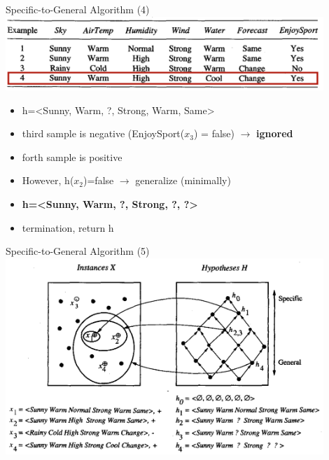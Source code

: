 \documentclass{beamer}
\begin{document}
\begin{frame}{Specific-to-General Algorithm (4)}
\centering
\includegraphics[width=0.9\textwidth]{enjoysport_examples_3}
\begin{itemize}
\item h=<Sunny, Warm, ?, Strong, Warm, Same>
\item third sample is negative (EnjoySport($x_3$) = false) $\rightarrow$ \textbf{ignored}
\end{itemize}

\begin{itemize}
\item forth sample is positive
\item However, h($x_2$)=false $\rightarrow$ generalize (minimally)
\item \textbf{h=<Sunny, Warm, ?, Strong, ?, ?>} %
\item termination, return h
\end{itemize}
\end{frame}

\begin{frame}{Specific-to-General Algorithm (5)}
\includegraphics[width=0.9\textwidth]{X_and_H_1}
\end{frame}
\end{document}
